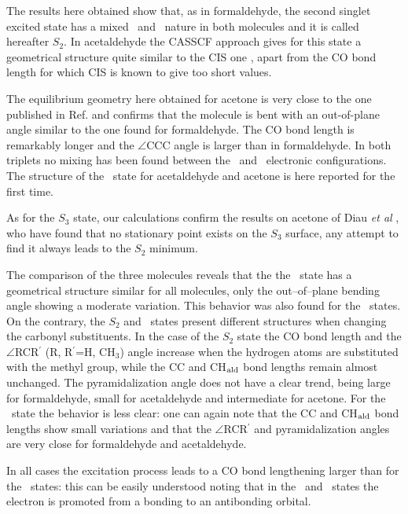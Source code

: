 The results here obtained show that, as in formaldehyde, the second singlet
excited state has a mixed \pipi\ and \spi\ nature in both molecules and it
is called hereafter $S_2$.  In acetaldehyde the CASSCF approach gives for
this state a geometrical structure quite similar to the CIS one
\cite{jpc-97-4293-1993}, apart from the CO bond length for which CIS is
known to give too short values.



The equilibrium geometry here obtained for acetone is very close to the one
published in Ref.  and confirms that the molecule is
bent with an out-of-plane angle similar to the one found for formaldehyde.
The CO bond length is remarkably longer and the $\angle$CCC angle is larger
than in formaldehyde.  In both triplets no mixing has been found between the
\pipi\ and \spi\ electronic configurations.  The structure of the \tspi\
state for acetaldehyde and acetone is here reported for the first time.

As for the $S_3$ state, our calculations confirm the results on acetone of
Diau {\it et al} \cite{cpc-3-57-2002}, who have found that no stationary
point exists on the $S_3$ surface, any attempt to find it always leads to
the  $S_2$ minimum.

The comparison of the three molecules reveals that the the \tpipi\ state has
a geometrical structure similar for all molecules, only the out--of--plane
bending angle showing a moderate variation.  This behavior was also found
for the \npi\ states. On the contrary, the $S_2$ and \tspi\ states present
different structures when changing the carbonyl substituents.  In the case
of the $S_2$ state the CO bond length and the $\angle$RCR$^\prime$ (R,
R$^\prime$=H, CH$_3$) angle increase when the hydrogen atoms are substituted
with the methyl group, while the CC and CH$_{\rm ald}$ bond lengths remain
almost unchanged. The pyramidalization angle does not have a clear trend,
being large for formaldehyde, small for acetaldehyde and intermediate for
acetone.  For the \tspi\ state the behavior is less clear: one can again
note that the CC and CH$_{\rm ald}$ bond lengths show small variations and
that the $\angle$RCR$^\prime$ and pyramidalization angles are very close for
formaldehyde and acetaldehyde. 

In all cases the excitation process leads to a CO bond lengthening larger
than for the \npi\ states: this can be easily understood noting that in the
\pipi\ and \spi\ states the electron is promoted from a bonding to an
antibonding orbital.


